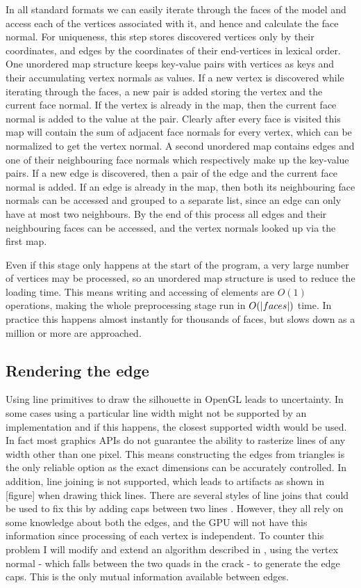 \documentclass[a4paper, 12pt]{article}
\DeclarePairedDelimiter{\abs}{\lvert}{\rvert}
\begin{document}
In all standard formats we can easily iterate through the faces of the model and access each of the vertices associated with it, and hence and calculate the face normal. For uniqueness, this step stores discovered vertices only by their coordinates, and edges by the coordinates of their end-vertices in lexical order. One unordered map structure keeps key-value pairs with vertices as keys and their accumulating vertex normals as values. If a new vertex is discovered while iterating through the faces, a new pair is added storing the vertex and the current face normal. If the vertex is already in the map, then the current face normal is added to the value at the pair. Clearly after every face is visited this map will contain the sum of adjacent face normals for every vertex, which can be normalized to get the vertex normal. A second unordered map contains edges and one of their neighbouring face normals which respectively make up the key-value pairs. If a new edge is discovered, then a pair of the edge and the current face normal is added. If an edge is already in the map, then both its neighbouring face normals can be accessed and grouped to a separate list, since an edge can only have at most two neighbours. By the end of this process all edges and their neighbouring faces can be accessed, and the vertex normals looked up via the first map.

Even if this stage only happens at the start of the program, a very large number of vertices may be processed, so an unordered map structure is used to reduce the loading time. This means writing and accessing of elements are $O(1)$ operations, making the whole preprocessing stage run in $O(\abs{faces})$ time. In practice this happens almost instantly for thousands of faces, but slows down as a million or more are approached.


\subsection{Rendering the edge}
Using line primitives to draw the silhouette in OpenGL leads to uncertainty. In some cases using a particular line width might not be supported by an implementation and if this happens, the closest supported width would be used. In fact most graphics APIs do not guarantee the ability to rasterize lines of any width other than one pixel. This means constructing the edges from triangles is the only reliable option as the exact dimensions can be accurately controlled. In addition, line joining is not supported, which leads to artifacts as shown in [figure] when drawing thick lines. There are several styles of line joins that could be used to fix this by adding caps between two lines \cite{Drakos1999}. However, they all rely on some knowledge about both the edges, and the GPU will not have this information since processing of each vertex is independent. To counter this problem I will modify and extend an algorithm described in \cite{Hughes2004}, using the vertex normal - which falls between the two quads in the crack - to generate the edge caps. This is the only mutual information available between edges.
\end{document}
